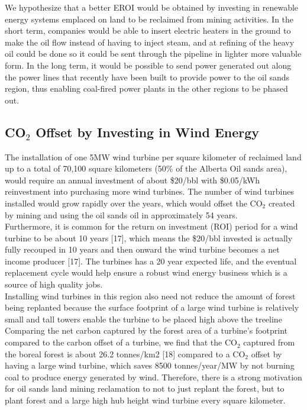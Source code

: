 \documentclass[11pt]{article}
\begin{document}
We hypothesize that a better EROI would be obtained by investing in renewable energy systems emplaced on land to be reclaimed from mining activities. In the short term, companies would be able to insert electric heaters in the ground to make the oil flow instead of having to inject steam, and at refining of the heavy oil could be done so it could be sent through the pipeline in lighter more valuable form. In the long term, it would be possible to send power generated out along the power lines that recently have been built to provide power to the oil sands region, thus enabling coal-fired power plants in the other regions to be phased out.

\subsection{CO$_2$ Offset by Investing in Wind Energy}

The installation of one 5MW wind turbine per square kilometer of reclaimed land up to a total of 70,100 square kilometers (50\% of the Alberta Oil sands area), would require an annual investment of about \$20/bbl with \$0.05/kWh reinvestment into purchasing more wind turbines.  The number of wind turbines installed would grow rapidly over the years, which would offset the CO$_2$ created by mining and using the oil sands oil in approximately 54 years. \\
 
Furthermore, it is common for the return on investment (ROI) period for a wind turbine to be about 10 years [17], which means the \$20/bbl invested is actually fully recouped in 10 years and then onward the wind turbine becomes a net income producer [17].  The turbines has a 20 year expected life, and the eventual replacement cycle would help ensure a robust wind energy business which is a source of high quality jobs. \\

Installing wind turbines in this region also need not reduce the amount of forest being replanted because the surface footprint of a large wind turbine is relatively small and tall towers enable the turbine to be placed high above the treeline Comparing the net carbon captured by the forest area of a turbine’s footprint compared to the carbon offset of a turbine, we find that the CO$_2$ captured from the boreal forest is about 26.2 tonnes/km2 [18] compared to a CO$_2$ offset by having a large wind turbine, which saves 8500 tonnes/year/MW by not burning coal to produce energy generated by wind. Therefore, there is a strong motivation for oil sands land mining reclamation to not to just replant the forest, but to plant forest and a large high hub height wind turbine every square kilometer. \\
  
\end{document}
